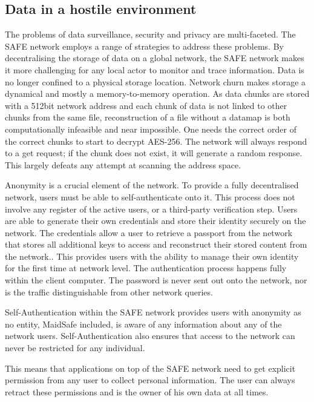 \documentclass[twocolumn,english]{article}
\begin{document}

\subsection{Data in a hostile environment}

The problems of data surveillance, security and privacy are multi-faceted. The SAFE network employs a range of strategies to address these problems. By decentralising the storage of data on a global network, the SAFE
network makes it more challenging for any local actor to monitor and trace information.  Data is no longer confined to a physical storage location.  Network churn makes storage a dynamical and mostly a memory-to-memory operation.
As data chunks are stored with a 512bit network address and each chunk of data
is not linked to other chunks from the same file, reconstruction of a file without a datamap is both computationally infeasible and near impossible.  One needs the correct order of the correct chunks to start to decrypt AES-256.  The network will always respond to a get request; if the chunk does not exist, it will generate a random response. This largely defeats any attempt at scanning the address space.

Anonymity is a crucial element of the network. To provide a fully decentralised network, users must be able to self-authenticate onto it.  This process does not involve any register of the active users, or a third-party verification step.  Users are able to generate their own credentials and store their identity securely on the network. The credentials allow a user to retrieve a passport from the network that stores all additional keys to access and reconstruct their stored content from the network.\cite{msSA}. This provides users with the ability to manage their own
identity for the first time at network level.  The authentication process happens fully within the client computer. The password is never sent out onto the network, nor is the traffic distinguishable from other network queries.

Self-Authentication within the SAFE network provides users
with anonymity as no entity, MaidSafe included, is aware of any information
about any of the network users. Self-Authentication also ensures
that access to the network can never be restricted for any individual.

This means that applications on top of the SAFE network  need to get explicit permission from any user to collect personal information.  The user can always retract these permissions and is the owner of his own data at all times.
\end{document}
